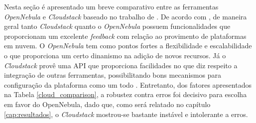 Nesta seção é apresentado um breve comparativo entre as ferramentas \textit{OpenNebula} e \textit{Cloudstack} baseado no trabalho de . De acordo com , de maneira geral tanto \textit{Cloudstack} quanto o \textit{OpenNebula} possuem funcionalidades que proporcionam um excelente \textit{feedback} com relação ao provimento de plataformas em nuvem. O \textit{OpenNebula} tem como pontos fortes a flexibilidade e escalabilidade o que proporciona um certo dinanismo na adição de novos recursos. Já o \textit{Cloudstack} provê uma API que proporciona facilidades no que diz respeito a integração de outras ferramentas, possibilitando bons mecanismos para configuração da plataforma como um todo \cite{salam}. Entretanto, dos fatores apresentados na Tabela \ref{cloud_comparison}, a robustez contra erros foi decisivo para escolha em favor do OpenNebula, dado que, como será relatado no capítulo \ref{cap:resultados}, o \textit{Cloudstack} mostrou-se bastante instável e intolerante a erros.

